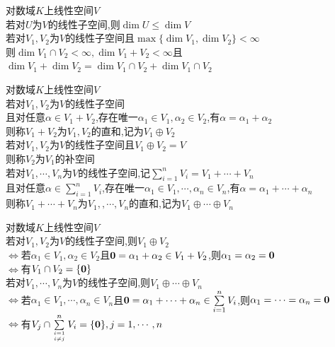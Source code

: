 \begin{dingli}
对数域$K$上线性空间$V$\\
若对$U$为$V$的线性子空间,则$\dim U\leq \dim V$\\
若对$V_1,V_2$为$V$的线性子空间且$\max\{\dim V_1,\dim V_2\}<\infty$\\
则$\dim V_1\cap V_2<\infty,\dim V_1+V_2<\infty$且$\dim V_1+\dim V_2=\dim V_1\cap V_2+\dim V_1\cap V_2$
\end{dingli}

\begin{dingyi}
对数域$K$上线性空间$V$\\
若对$V_1,V_2$为$V$的线性子空间\\
且对任意$\alpha\in V_1+V_2$,存在唯一$\alpha_1\in V_1,\alpha_2\in V_2$,有$\alpha=\alpha_1+\alpha_2$\\
则称$V_1+V_2$为$V_1,V_2$的直和,记为$V_1\oplus V_2$\\
若对$V_1,V_2$为$V$的线性子空间且$V_1\oplus V_2=V$\\
则称$V_2$为$V_1$的补空间\\
若对$V_1,\cdots,V_n$为$V$的线性子空间,记$\sum\limits_{i=1}^{n}V_i=V_1+\cdots+V_n$\\
且对任意$\alpha\in \sum\limits_{i=1}^{n}V_i$,存在唯一$\alpha_1\in V_1,\cdots,\alpha_n\in V_n$,有$\alpha=\alpha_1+\cdots+\alpha_n$\\
则称$V_1+\cdots+V_n$为$V_1,,\cdots,V_n$的直和,记为$V_1\oplus\cdots\oplus V_n$
\end{dingyi}

\begin{dingli}
对数域$K$上线性空间$V$\\
若对$V_1,V_2$为$V$的线性子空间,则$V_1\oplus V_2$\\
$\Leftrightarrow$若$\alpha_1\in V_1,\alpha_2\in V_2$且${\bf0}=\alpha_1+\alpha_2\in V_1+V_2$,则$\alpha_1=\alpha_2={\bf0}$\\
$\Leftrightarrow$有$V_1\cap V_2=\{{\bf0}\}$\\
若对$V_1,\cdots,V_n$为$V$的线性子空间,则$V_1\oplus\cdots\oplus V_n$\\
$\Leftrightarrow$若$\alpha_1\in V_1,\cdots,\alpha_n\in V_n$且${\bf0}=\alpha_1+\cdots+\alpha_n\in \sum\limits_{i=1}^{n}V_i$,则$\alpha_1=\cdots=\alpha_n={\bf0}$\\
$\Leftrightarrow$有$V_j\cap\sum\limits_{i=1\atop i\neq j}^{n}V_i=\{{\bf0}\},j=1,\cdots,n$
\end{dingli}

